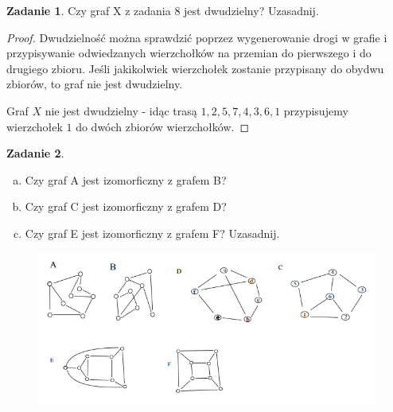 \documentclass[11pt]{article}
\theoremstyle{definition}
\newtheorem{zadanie}{Zadanie}
\begin{document}
\begin{zadanie}
    Czy graf X z zadania 8 jest dwudzielny? Uzasadnij.
\end{zadanie}
\begin{proof}
    Dwudzielność można sprawdzić poprzez wygenerowanie drogi w grafie i przypisywanie odwiedzanych wierzchołków na przemian do pierwszego i do drugiego zbioru. Jeśli jakikolwiek wierzchołek zostanie przypisany do obydwu zbiorów, to graf nie jest dwudzielny.

    Graf $X$ nie jest dwudzielny - idąc trasą $1,2,5,7,4,3,6,1$ przypisujemy wierzchołek $1$ do dwóch zbiorów wierzchołków.
\end{proof}
\begin{zadanie}
    \begin{enumerate}[a)]
        \item Czy graf A jest izomorficzny z grafem B?
        \item Czy graf C jest izomorficzny z grafem D?
        \item Czy graf E jest izomorficzny z grafem F? Uzasadnij.
    \end{enumerate}
    \begin{figure}[H]
        \centering
        \includegraphics[width=0.8\linewidth]{./data/kol-1-10.png}
    \end{figure}
\end{zadanie}
\end{document}
